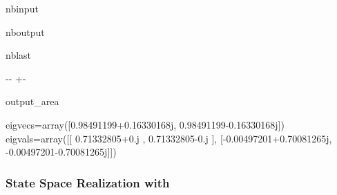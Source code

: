 \documentclass[letterpaper,10pt,english]{sphinxmanual}
\begin{document}
\begin{sphinxuseclass}{nbinput}
{
\begin{sphinxVerbatim}[commandchars=\\\{\}]
\llap{\color{nbsphinxin}[5]:\,\hspace{\fboxrule}\hspace{\fboxsep}}
\end{sphinxVerbatim}
}

\end{sphinxuseclass}
\begin{sphinxuseclass}{nboutput}
\begin{sphinxuseclass}{nblast}
{

\kern-\sphinxverbatimsmallskipamount\kern-\baselineskip
\kern+\FrameHeightAdjust\kern-\fboxrule
\vspace{\nbsphinxcodecellspacing}

\begin{sphinxuseclass}{output_area}
\begin{sphinxuseclass}{}


\begin{sphinxVerbatim}[commandchars=\\\{\}]
eigvecs=array([0.98491199+0.16330168j, 0.98491199-0.16330168j])
 eigvals=array([[ 0.71332805+0.j        ,  0.71332805-0.j        ],
       [-0.00497201+0.70081265j, -0.00497201-0.70081265j]])
\end{sphinxVerbatim}



\end{sphinxuseclass}
\end{sphinxuseclass}
}

\end{sphinxuseclass}
\end{sphinxuseclass}

\subsubsection{State Space Realization with }
\label{\detokenize{examples/00_Overview:State-Space-Realization-with-mdof.sysid()}}
\end{document}
